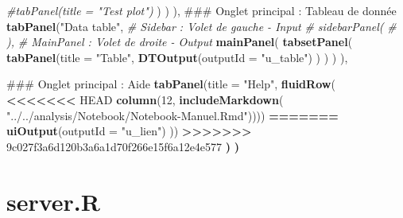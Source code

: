 \documentclass[]{report}
\newenvironment{Shaded}{\begin{snugshade}}{\end{snugshade}}
\newcommand{\KeywordTok}[1]{\textcolor[rgb]{0.13,0.29,0.53}{\textbf{#1}}}
\newcommand{\DataTypeTok}[1]{\textcolor[rgb]{0.13,0.29,0.53}{#1}}
\newcommand{\DecValTok}[1]{\textcolor[rgb]{0.00,0.00,0.81}{#1}}
\newcommand{\StringTok}[1]{\textcolor[rgb]{0.31,0.60,0.02}{#1}}
\newcommand{\CommentTok}[1]{\textcolor[rgb]{0.56,0.35,0.01}{\textit{#1}}}
\newcommand{\OperatorTok}[1]{\textcolor[rgb]{0.81,0.36,0.00}{\textbf{#1}}}
\newcommand{\ErrorTok}[1]{\textcolor[rgb]{0.64,0.00,0.00}{\textbf{#1}}}
\newcommand{\NormalTok}[1]{#1}
\begin{document}
\begin{Shaded}
\begin{Highlighting}[]
                 \CommentTok{#tabPanel(title = "Test plot")}
\NormalTok{               )}
\NormalTok{             )}
\NormalTok{    ),}
\NormalTok{    ### Onglet principal : Tableau de donnée}
    \KeywordTok{tabPanel}\NormalTok{(}\StringTok{"Data table"}\NormalTok{,}
             \CommentTok{# Sidebar : Volet de gauche - Input}
             \CommentTok{# sidebarPanel(}
             \CommentTok{# ),}
             \CommentTok{# MainPanel : Volet de droite - Output}
             \KeywordTok{mainPanel}\NormalTok{(}
               \KeywordTok{tabsetPanel}\NormalTok{(}
                 \KeywordTok{tabPanel}\NormalTok{(}\DataTypeTok{title =} \StringTok{"Table"}\NormalTok{, }\KeywordTok{DTOutput}\NormalTok{(}\DataTypeTok{outputId =} \StringTok{"u_table"}\NormalTok{)}
\NormalTok{                          )}
\NormalTok{               )}
\NormalTok{             )}
\NormalTok{    ),}
    
\NormalTok{    ### Onglet principal : Aide}
    \KeywordTok{tabPanel}\NormalTok{(}\DataTypeTok{title =} \StringTok{"Help"}\NormalTok{,}
             \KeywordTok{fluidRow}\NormalTok{(}
\OperatorTok{<}\ErrorTok{<<<<<<}\StringTok{ }\NormalTok{HEAD}
               \KeywordTok{column}\NormalTok{(}\DecValTok{12}\NormalTok{, }\KeywordTok{includeMarkdown}\NormalTok{(}
                 \StringTok{"../../analysis/Notebook/Notebook-Manuel.Rmd"}\NormalTok{))))}
\OperatorTok{==}\ErrorTok{=====}
\StringTok{               }\KeywordTok{uiOutput}\NormalTok{(}\DataTypeTok{outputId =} \StringTok{"u_lien"}\NormalTok{)}
\NormalTok{             ))}
\OperatorTok{>}\ErrorTok{>>>>>>}\StringTok{ }\NormalTok{9c027f3a6d120b3a6a1d70f266e15f6a12e4e577}
  \ErrorTok{)}
\ErrorTok{)}
\end{Highlighting}
\end{Shaded}

\section{server.R}\label{server.r}
\end{document}
